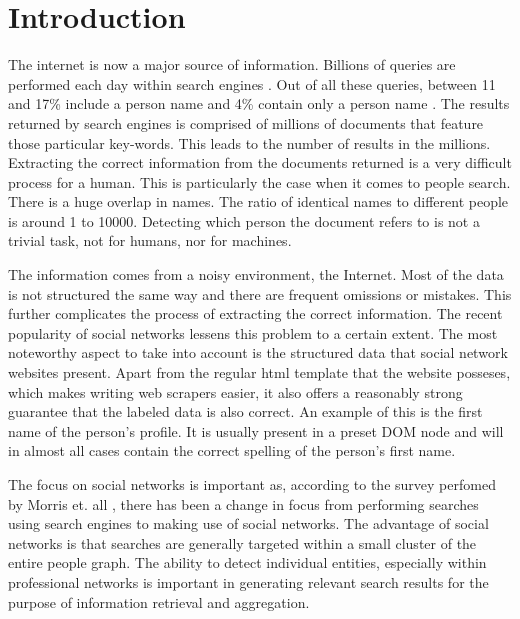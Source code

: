 \chapter{Introduction}
\label{chapter:intro}

The internet is now a major source of information. Billions of queries are performed
each day within search engines \cite{search-stats}. Out of all these queries, between 11 and 17\%
include a person name and 4\% contain only a person name \cite{weps3-eval}\cite{weps2-eval}.
The results returned by search engines is comprised of millions of documents 
that feature those particular key-words. This leads to the number of results 
in the millions. Extracting the correct information from the documents returned 
is a very difficult process for a human. This is particularly the case when it 
comes to people search. There is a huge overlap in names. The ratio of identical 
names to different people is around 1 to 10000. Detecting which person the document 
refers to is not a trivial task, not for humans, nor for machines.

The information comes from a noisy environment, the Internet. Most of the data
is not structured the same way and there are frequent omissions or mistakes.
This further complicates the process of extracting the correct information.
The recent popularity of social networks lessens this problem to a certain
extent. \cite{social-networks} The most noteworthy aspect to take into account is 
the structured data that social network websites present. \cite{social-networks-scraping}
Apart from the regular html template that the website posseses, which makes writing
web scrapers easier, it also offers a reasonably strong guarantee that the labeled
data is also correct. An example of this is the first name of the person's profile.
It is usually present in a preset DOM node and will in almost all cases contain
the correct spelling of the person's first name.

The focus on social networks is important as, according to the survey perfomed by
Morris et. all \cite{morris2010people}, there has been a change in focus from
performing searches using search engines to making use of social
networks. The advantage of social networks is that searches are generally targeted
within a small cluster of the entire people graph. The ability to detect individual
entities, especially within professional networks \cite{watts2002identity} is
important in generating relevant search results for the purpose of information
retrieval and aggregation.

